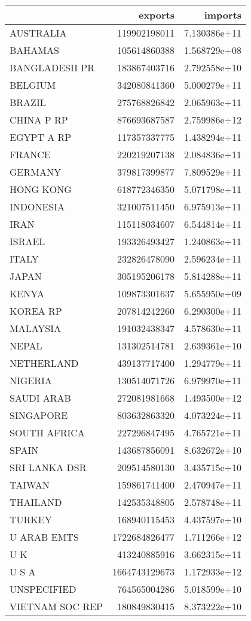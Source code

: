 \begin{tabular}{lrr}
\toprule
{} &        exports &       imports \\
\midrule
AUSTRALIA       &   119902198011 &  7.130386e+11 \\
BAHAMAS         &   105614860388 &  1.568729e+08 \\
BANGLADESH PR   &   183867403716 &  2.792558e+10 \\
BELGIUM         &   342080841360 &  5.000279e+11 \\
BRAZIL          &   275768826842 &  2.065963e+11 \\
CHINA P RP      &   876693687587 &  2.759986e+12 \\
EGYPT A RP      &   117357337775 &  1.438294e+11 \\
FRANCE          &   220219207138 &  2.084836e+11 \\
GERMANY         &   379817399877 &  7.809529e+11 \\
HONG KONG       &   618772346350 &  5.071798e+11 \\
INDONESIA       &   321007511450 &  6.975913e+11 \\
IRAN            &   115118034607 &  6.544814e+11 \\
ISRAEL          &   193326493427 &  1.240863e+11 \\
ITALY           &   232826478090 &  2.596234e+11 \\
JAPAN           &   305195206178 &  5.814288e+11 \\
KENYA           &   109873301637 &  5.655950e+09 \\
KOREA RP        &   207814242260 &  6.290300e+11 \\
MALAYSIA        &   191032438347 &  4.578630e+11 \\
NEPAL           &   131302514781 &  2.639361e+10 \\
NETHERLAND      &   439137717400 &  1.294779e+11 \\
NIGERIA         &   130514071726 &  6.979970e+11 \\
SAUDI ARAB      &   272081981668 &  1.493500e+12 \\
SINGAPORE       &   803632863320 &  4.073224e+11 \\
SOUTH AFRICA    &   227296847495 &  4.765721e+11 \\
SPAIN           &   143687856091 &  8.632672e+10 \\
SRI LANKA DSR   &   209514580130 &  3.435715e+10 \\
TAIWAN          &   159861741400 &  2.470947e+11 \\
THAILAND        &   142535348805 &  2.578748e+11 \\
TURKEY          &   168940115453 &  4.437597e+10 \\
U ARAB EMTS     &  1722684826477 &  1.711266e+12 \\
U K             &   413240885916 &  3.662315e+11 \\
U S A           &  1664743129673 &  1.172933e+12 \\
UNSPECIFIED     &   764565004286 &  5.018599e+10 \\
VIETNAM SOC REP &   180849830415 &  8.373222e+10 \\
\bottomrule
\end{tabular}
